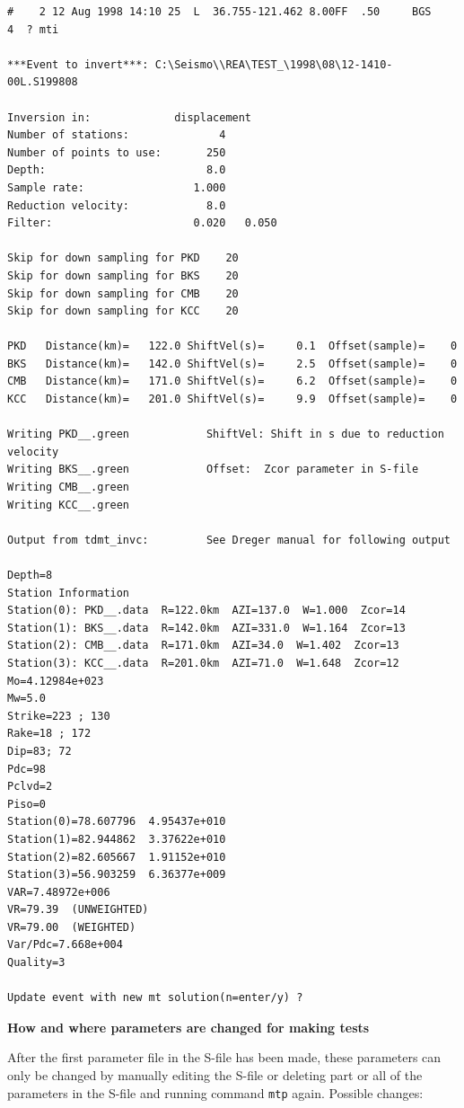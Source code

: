 \begin{verbatim}
#    2 12 Aug 1998 14:10 25  L  36.755-121.462 8.00FF  .50     BGS    4  ? mti

***Event to invert***: C:\Seismo\\REA\TEST_\1998\08\12-1410-00L.S199808

Inversion in:             displacement
Number of stations:              4
Number of points to use:       250
Depth:                         8.0
Sample rate:                 1.000
Reduction velocity:            8.0
Filter:                      0.020   0.050

Skip for down sampling for PKD    20
Skip for down sampling for BKS    20
Skip for down sampling for CMB    20
Skip for down sampling for KCC    20

PKD   Distance(km)=   122.0 ShiftVel(s)=     0.1  Offset(sample)=    0
BKS   Distance(km)=   142.0 ShiftVel(s)=     2.5  Offset(sample)=    0
CMB   Distance(km)=   171.0 ShiftVel(s)=     6.2  Offset(sample)=    0
KCC   Distance(km)=   201.0 ShiftVel(s)=     9.9  Offset(sample)=    0

Writing PKD__.green            ShiftVel: Shift in s due to reduction velocity             
Writing BKS__.green            Offset:  Zcor parameter in S-file
Writing CMB__.green
Writing KCC__.green

Output from tdmt_invc:         See Dreger manual for following output

Depth=8
Station Information
Station(0): PKD__.data  R=122.0km  AZI=137.0  W=1.000  Zcor=14
Station(1): BKS__.data  R=142.0km  AZI=331.0  W=1.164  Zcor=13
Station(2): CMB__.data  R=171.0km  AZI=34.0  W=1.402  Zcor=13
Station(3): KCC__.data  R=201.0km  AZI=71.0  W=1.648  Zcor=12
Mo=4.12984e+023
Mw=5.0
Strike=223 ; 130
Rake=18 ; 172
Dip=83; 72
Pdc=98
Pclvd=2
Piso=0
Station(0)=78.607796  4.95437e+010
Station(1)=82.944862  3.37622e+010
Station(2)=82.605667  1.91152e+010
Station(3)=56.903259  6.36377e+009
VAR=7.48972e+006
VR=79.39  (UNWEIGHTED)
VR=79.00  (WEIGHTED)
Var/Pdc=7.668e+004
Quality=3

Update event with new mt solution(n=enter/y) ?
\end{verbatim}

\textbf{How and where parameters are changed for making tests}

After the first parameter file in the S-file has been made, these parameters can only be changed by manually editing the S-file or deleting part or all of the parameters in the S-file and running command \texttt{mtp} again. Possible changes:

